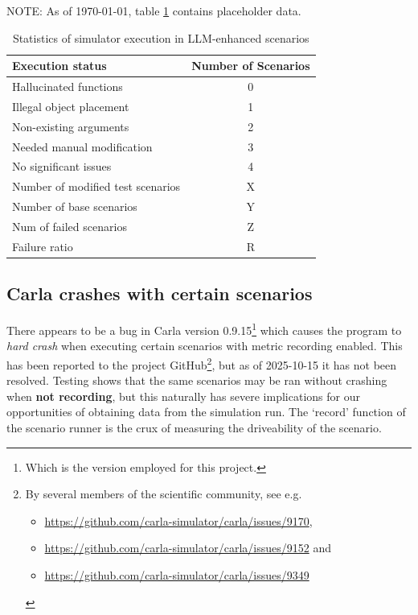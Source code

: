 \begin{tcolorbox}[colback=red!5!white, colframe=red!80!black, title=WIP warning]
    NOTE: As of \today, table \ref{tab:scenarioFailures} contains placeholder data.
\end{tcolorbox}

\begin{table}[htbp]
    \centering
    \caption{Statistics of simulator execution in LLM-enhanced scenarios}
    \begin{tabular}{l c}
        \toprule
        Execution status                  & Number of Scenarios \\
        \midrule
        Hallucinated functions            & 0                   \\
        Illegal object placement          & 1                   \\
        Non-existing arguments            & 2                   \\
        Needed manual modification        & 3                   \\
        No significant issues             & 4                   \\
        \midrule
        Number of modified test scenarios & X                   \\
        Number of base scenarios          & Y                   \\
        Num of failed scenarios           & Z                   \\ %
        Failure ratio                     & R                   \\ %
        \bottomrule
    \end{tabular}
    \label{tab:scenarioFailures}
\end{table}


\subsection{Carla crashes with certain scenarios}

There appears to be a bug in Carla version 0.9.15\footnote{Which is the version
    employed for this project.} which causes the program to \emph{hard crash} when
executing certain scenarios with metric recording enabled. This has been
reported to the project GitHub\footnote{By several members of the scientific community, see e.g.
    \begin{itemize}\item  \url{https://github.com/carla-simulator/carla/issues/9170}, \item
              \url{https://github.com/carla-simulator/carla/issues/9152} and \item
              \url{https://github.com/carla-simulator/carla/issues/9349}\end{itemize}}, but as of 2025-10-15
it has not been resolved. Testing shows that the same scenarios may be ran without crashing when
\textbf{not recording}, but this naturally has severe implications for our
opportunities of obtaining data from the simulation run. The `record' function
of the scenario runner is the crux of measuring the driveability of the
scenario.



